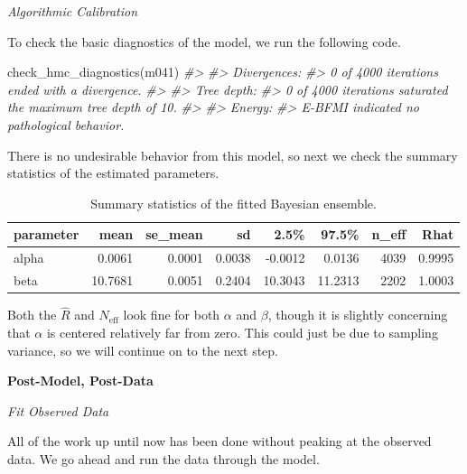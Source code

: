 \documentclass[11pt, oneside, openany]{scrbook}
\newenvironment{Shaded}{\begin{snugshade}}{\end{snugshade}}
\newcommand{\CommentTok}[1]{\textcolor[rgb]{0.56,0.35,0.01}{\textit{#1}}}
\newcommand{\FunctionTok}[1]{\textcolor[rgb]{0.00,0.00,0.00}{#1}}
\newcommand{\NormalTok}[1]{#1}
\begin{document}

\emph{Algorithmic Calibration}

To check the basic diagnostics of the model, we run the following code.


\begin{Shaded}
\begin{Highlighting}[]
\FunctionTok{check\_hmc\_diagnostics}\NormalTok{(m041)}
\CommentTok{\#\textgreater{} }
\CommentTok{\#\textgreater{} Divergences:}
\CommentTok{\#\textgreater{} 0 of 4000 iterations ended with a divergence.}
\CommentTok{\#\textgreater{} }
\CommentTok{\#\textgreater{} Tree depth:}
\CommentTok{\#\textgreater{} 0 of 4000 iterations saturated the maximum tree depth of 10.}
\CommentTok{\#\textgreater{} }
\CommentTok{\#\textgreater{} Energy:}
\CommentTok{\#\textgreater{} E{-}BFMI indicated no pathological behavior.}
\end{Highlighting}
\end{Shaded}


There is no undesirable behavior from this model, so next we check the summary statistics of the estimated parameters.

\begin{table}[!h]

\caption{\label{tab:ch041-Cloudy-Toupee}Summary statistics of the fitted Bayesian ensemble.}
\centering
\begin{tabular}[t]{lrrrrrrr}
\toprule
parameter & mean & se\_mean & sd & 2.5\% & 97.5\% & n\_eff & Rhat\\
\midrule
alpha & 0.0061 & 0.0001 & 0.0038 & -0.0012 & 0.0136 & 4039 & 0.9995\\
beta & 10.7681 & 0.0051 & 0.2404 & 10.3043 & 11.2313 & 2202 & 1.0003\\
\bottomrule
\end{tabular}
\end{table}

Both the \(\hat{R}\) and \(N_{\mathrm{eff}}\) look fine for both \(\alpha\) and \(\beta\), though it is slightly concerning that \(\alpha\) is centered relatively far from zero. This could just be due to sampling variance, so we will continue on to the next step.

\textbf{Post-Model, Post-Data}

\emph{Fit Observed Data}

All of the work up until now has been done without peaking at the observed data. We go ahead and run the data through the model.
\end{document}

